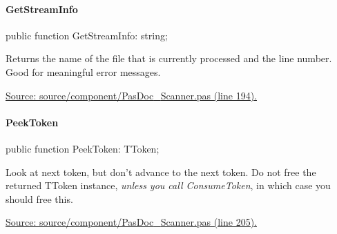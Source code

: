 \documentclass{report}
\newif\ifpdf
\begin{document}
\paragraph*{GetStreamInfo}\hspace*{\fill}

\label{PasDoc_Scanner.TScanner-GetStreamInfo}
\begin{list}{}{
\setlength{\itemindent}{0cm}
\setlength{\listparindent}{0cm}
\setlength{\leftmargin}{\evensidemargin}
\addtolength{\leftmargin}{\tmplength}
\settowidth{\labelsep}{X}
\addtolength{\leftmargin}{\labelsep}
\setlength{\labelwidth}{\tmplength}
}
\item[\textbf{Declaration}\hfill]
\ifpdf
\begin{flushleft}
\fi
\begin{ttfamily}
public function GetStreamInfo: string;\end{ttfamily}

\ifpdf
\end{flushleft}
\fi

\par
\item[\textbf{Description}]
Returns the name of the file that is currently processed and the line number. Good for meaningful error messages.\par
\href{https://github.com/pasdoc/pasdoc/blob/master/source/component/PasDoc_Scanner.pas#L194}{Source: source/component/PasDoc{\_}Scanner.pas (line 194).}

\end{list}
\paragraph*{PeekToken}\hspace*{\fill}

\label{PasDoc_Scanner.TScanner-PeekToken}
\begin{list}{}{
\setlength{\itemindent}{0cm}
\setlength{\listparindent}{0cm}
\setlength{\leftmargin}{\evensidemargin}
\addtolength{\leftmargin}{\tmplength}
\settowidth{\labelsep}{X}
\addtolength{\leftmargin}{\labelsep}
\setlength{\labelwidth}{\tmplength}
}
\item[\textbf{Declaration}\hfill]
\ifpdf
\begin{flushleft}
\fi
\begin{ttfamily}
public function PeekToken: TToken;\end{ttfamily}

\ifpdf
\end{flushleft}
\fi

\par
\item[\textbf{Description}]
Look at next token, but don't advance to the next token. Do not free the returned TToken instance, \textit{unless you call ConsumeToken}, in which case you should free this.\par
\href{https://github.com/pasdoc/pasdoc/blob/master/source/component/PasDoc_Scanner.pas#L205}{Source: source/component/PasDoc{\_}Scanner.pas (line 205).}

\end{list}
\end{document}
